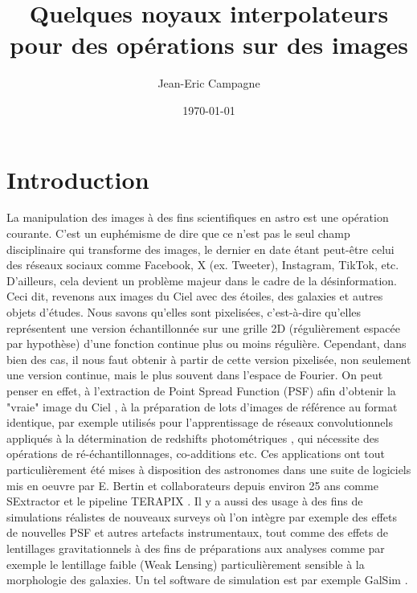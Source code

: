 \documentclass[11pt,twoside]{article}
\title{Quelques noyaux interpolateurs pour des opérations sur des images}
\author{Jean-Eric Campagne}
\date{\today}
\begin{document}
\maketitle
\renewcommand{\baselinestretch}{0.75}\normalsize
\tableofcontents
\renewcommand{\baselinestretch}{1.0}\normalsize

\section{Introduction}
\label{sec:Intro}
%
La manipulation des images à des fins scientifiques  en astro est une opération courante. C'est un euphémisme de dire que ce n'est pas le seul champ disciplinaire qui transforme des images, le dernier en date étant peut-être  celui des réseaux sociaux comme Facebook, X (ex. Tweeter), Instagram, TikTok, etc. D'ailleurs, cela devient un problème majeur dans le cadre de la désinformation. Ceci dit, revenons aux images du Ciel avec des étoiles, des galaxies et autres objets d'études. Nous savons qu'elles sont pixelisées, c'est-à-dire qu'elles représentent une version échantillonnée sur une grille 2D (régulièrement espacée par hypothèse) d'une fonction continue plus ou moins régulière. Cependant, dans bien des cas, il nous faut obtenir à partir de cette version pixelisée, non seulement une version continue, mais le plus souvent dans l'espace de Fourier. On peut penser en effet, à l'extraction de Point Spread Function (PSF) afin d'obtenir la "vraie" image du Ciel \citep{2011ASPC..442..435B}, à la préparation de lots d'images de référence au format identique, par exemple utilisés pour 
l'apprentissage de réseaux convolutionnels appliqués à la détermination de redshifts photométriques \citep{2019A&A...621A..26P}, qui nécessite des opérations de ré-échantillonnages, co-additions etc. Ces applications ont tout particulièrement été mises à disposition des astronomes dans une suite de logiciels mis en oeuvre par E. Bertin et collaborateurs depuis environ 25 ans comme \textsf{SExtractor} \citep{1996A&AS..117..393B} et  le pipeline \textsf{TERAPIX} \citep{2002ASPC..281..228B}. Il y a aussi des usage à des fins de simulations réalistes de nouveaux surveys où l'on intègre par exemple des effets de nouvelles PSF et autres artefacts instrumentaux, tout comme des effets de lentillages gravitationnels à des fins de préparations aux analyses comme par exemple le lentillage faible (Weak Lensing) particulièrement sensible à la morphologie des galaxies. Un tel software de simulation est par exemple \textsf{GalSim} \citep{2015A&C....10..121R}.
\end{document}
